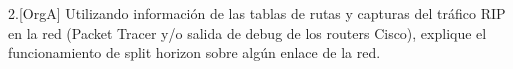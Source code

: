 \begin{ejer}
2.[OrgA] Utilizando información de las tablas de rutas y capturas del tráfico RIP en la red (Packet Tracer y/o salida de debug de los routers Cisco), explique el funcionamiento de split horizon sobre algún enlace de la red.
\end{ejer}